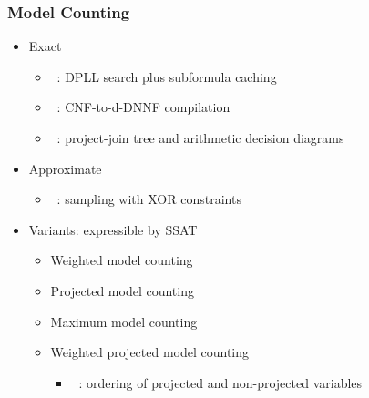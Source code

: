 \begin{frame}
      \frametitle{Model Counting}
      \begin{itemize}
            \item Exact
                  \begin{itemize}
                        \item \cachet~\cite{Sang2004,Sang2005ModelCounting}: DPLL search plus subformula caching
                        \item \ctwod~\cite{Darwiche2001,Darwiche2002dDNNF}: CNF-to-d-DNNF compilation
                        \item \dpmc~\cite{Dudek2020}: project-join tree and arithmetic decision diagrams
                  \end{itemize}
                  \pause
            \item Approximate
                  \begin{itemize}
                        \item \approxmc~\cite{Chakraborty2013,Chakraborty2016}: sampling with XOR constraints
                  \end{itemize}
                  \pause
            \item Variants: expressible by SSAT
                  \begin{itemize}
                        \item Weighted model counting~\cite{Sang2005BayesianInference,Chavira2008}
                        \item Projected model counting~\cite{Aziz2015}
                        \item Maximum model counting~\cite{Fremont2017}
                        \item Weighted projected model counting
                              \begin{itemize}
                                    \item \procount~\cite{Dudek2021}: ordering of projected and non-projected variables
                              \end{itemize}
                  \end{itemize}
      \end{itemize}
\end{frame}

